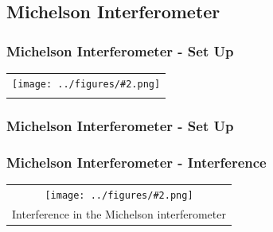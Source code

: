 \documentclass{beamer}
\newcommand{\gra}[3][]{
	\begin{table}
	\centering
	\begin{tabular}[width=\textwidth]{c}
		\texttt{[image: ../figures/\#2.png]}\\
		\small #3
	\end{tabular}
	\end{table}
}
\begin{document}
\subsection{Michelson Interferometer}
\frame{\tableofcontents[currentsubsection]}
\begin{frame}
	\frametitle{Michelson Interferometer - Set Up}
	\gra[0.85]{Coherence_length}{}%
\end{frame}
\begin{frame}
	\frametitle{Michelson Interferometer - Set Up}
	\begin{figure}
		\centering
	\end{figure}
\end{frame}
\begin{frame}
	\frametitle{Michelson Interferometer - Interference}
	\gra[0.67]{michelson1}{Interference in the Michelson interferometer}
	\centering{}
\end{frame}
\end{document}
